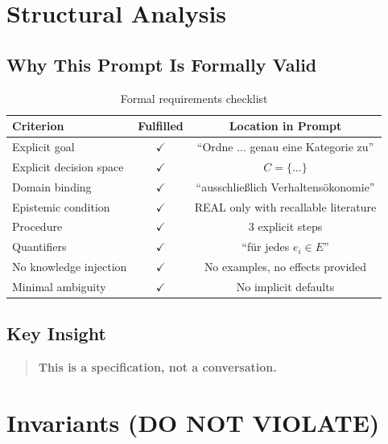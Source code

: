 \documentclass[11pt,a4paper]{article}
\begin{document}
\section{Structural Analysis}

\subsection{Why This Prompt Is Formally Valid}

\begin{table}[h]
\centering
\caption{Formal requirements checklist}
\begin{tabular}{lcc}
\toprule
\textbf{Criterion} & \textbf{Fulfilled} & \textbf{Location in Prompt} \\
\midrule
Explicit goal & $\checkmark$ & ``Ordne ... genau eine Kategorie zu'' \\
Explicit decision space & $\checkmark$ & $C = \{\dots\}$ \\
Domain binding & $\checkmark$ & ``ausschließlich Verhaltensökonomie'' \\
Epistemic condition & $\checkmark$ & REAL only with recallable literature \\
Procedure & $\checkmark$ & 3 explicit steps \\
Quantifiers & $\checkmark$ & ``für jedes $e_i \in E$'' \\
No knowledge injection & $\checkmark$ & No examples, no effects provided \\
Minimal ambiguity & $\checkmark$ & No implicit defaults \\
\bottomrule
\end{tabular}
\end{table}

\subsection{Key Insight}

\begin{quote}
\textbf{This is a specification, not a conversation.}
\end{quote}


\section{Invariants (DO NOT VIOLATE)}
\end{document}
